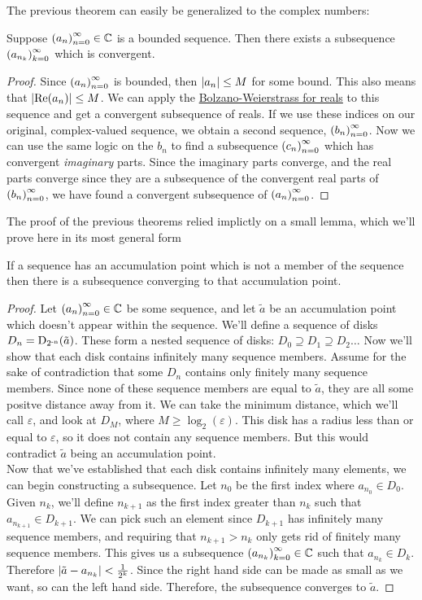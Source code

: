 The previous theorem can easily be generalized to the complex numbers:
\begin{theorem}
Suppose $\seq{a} \in \C$ is a bounded sequence. Then there exists a subsequence $\seq{a}[n_k][k]$ which is convergent. 
\end{theorem}
\begin{proof}
Since $\seq{a}$ is bounded, then $\modulus{a_n} \leq M$ for some bound. This also means that $\modulus{\rpart{a_n}} \leq M$. We can apply the \hyperlink{Bolzano-Weierstrass Theorem, Real-Valued Case}{Bolzano-Weierstrass for reals} to this sequence and get a convergent subsequence of reals. If we use these indices on our original, complex-valued sequence, we obtain a second sequence, $\seq{b}$. Now we can use the same logic on the $b_n$ to find a subsequence $\seq{c}$ which has convergent \emph{imaginary} parts. Since the imaginary parts converge, and the real parts converge since they are a subsequence of the convergent real parts of $\seq{b}$, we have found a convergent subsequence of $\seq{a}$.
\end{proof}
The proof of the previous theorems relied implictly on a small lemma, which we'll prove here in its most general form
\begin{lemma}
If a sequence has an accumulation point which is not a member of the sequence then there is a subsequence converging to that accumulation point.
\end{lemma}
\begin{proof}
Let $\seq{a} \in \C$ be some sequence, and let $\tilde{a}$ be an accumulation point which doesn't appear within the sequence. We'll define a sequence of disks $D_n = \disk{\tilde{a}}{2^{-n}}$. These form a nested sequence of disks: $D_0 \supseteq D_1 \supseteq D_2 \ldots$ Now we'll show that each disk contains infinitely many sequence members. Assume for the sake of contradiction that some $D_n$ contains only finitely many sequence members. Since none of these sequence members are equal to $\tilde{a}$, they are all some positve distance away from it. We can take the minimum distance, which we'll call $\varepsilon$, and look at $D_M$, where $M \geq \log_2 (\varepsilon)$. This disk has a radius less than or equal to $\varepsilon$, so it does not contain any sequence members. But this would contradict $\tilde{a}$ being an accumulation point.\\
Now that we've established that each disk contains infinitely many elements, we can begin constructing a subsequence. Let $n_0$ be the first index where $a_{n_0} \in D_0$. Given $n_k$, we'll define $n_{k+1}$ as the first index greater than $n_k$ such that $a_{n_{k+1}} \in D_{k+1}$. We can pick such an element since $D_{k+1}$ has infinitely many sequence members, and requiring that $n_{k+1} > n_k$ only gets rid of finitely many sequence members. This gives us a subsequence $\seq{a}[n_k][k] \in \C$ such that $a_{n_k} \in D_k$. Therefore $\modulus{\tilde{a}-a_{n_k}} < \frac{1}{2^k}$. Since the right hand side can be made as small as we want, so can the left hand side. Therefore, the subsequence converges to $\tilde{a}$. 
\end{proof}
